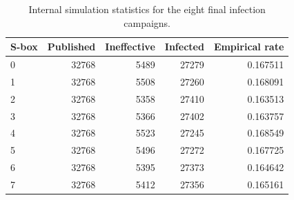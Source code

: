 \begin{table}[t]
\centering
\caption{Internal simulation statistics for the eight final infection campaigns.}
\label{tab:s3-fixed-campaigns}
\begin{tabular}{lrrrr}
\toprule
S-box & Published & Ineffective & Infected & Empirical rate \\
\midrule
0 & 32768 & 5489 & 27279 & 0.167511 \\
1 & 32768 & 5508 & 27260 & 0.168091 \\
2 & 32768 & 5358 & 27410 & 0.163513 \\
3 & 32768 & 5366 & 27402 & 0.163757 \\
4 & 32768 & 5523 & 27245 & 0.168549 \\
5 & 32768 & 5496 & 27272 & 0.167725 \\
6 & 32768 & 5395 & 27373 & 0.164642 \\
7 & 32768 & 5412 & 27356 & 0.165161 \\
\bottomrule
\end{tabular}
\end{table}

